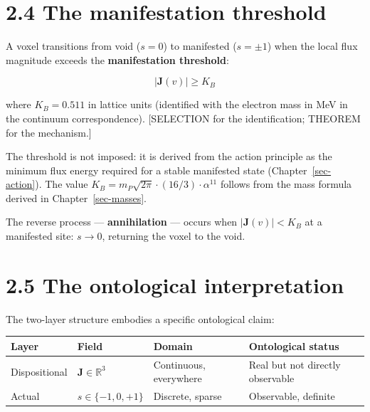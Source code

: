 \documentclass[
  11pt,
  letterpaper,
  twoside,
  openright]{book}
\begin{document}
\section{2.4 The manifestation threshold}\label{sec-threshold}

A voxel transitions from void (\(s = 0\)) to manifested (\(s = \pm 1\))
when the local flux magnitude exceeds the \textbf{manifestation
threshold}:

\[
|\mathbf{J}(v)| \geq K_B
\tag{2.2}
\]

where \(K_B = 0.511\) in lattice units (identified with the electron
mass in MeV in the continuum correspondence). {[}SELECTION for the
identification; THEOREM for the mechanism.{]}

The threshold is not imposed: it is derived from the action principle as
the minimum flux energy required for a stable manifested state
(Chapter~\ref{sec-action}). The value
\(K_B = m_P \sqrt{2\pi} \cdot (16/3) \cdot \alpha^{11}\) follows from
the mass formula derived in Chapter~\ref{sec-masses}.

The reverse process --- \textbf{annihilation} --- occurs when
\(|\mathbf{J}(v)| < K_B\) at a manifested site: \(s \to 0\), returning
the voxel to the void.

\section{2.5 The ontological
interpretation}\label{the-ontological-interpretation}

The two-layer structure embodies a specific ontological claim:

\begin{longtable}[]{@{}
  >{\raggedright\arraybackslash}p{}
  >{\raggedright\arraybackslash}p{}
  >{\raggedright\arraybackslash}p{}
  >{\raggedright\arraybackslash}p{}@{}}
\toprule\noalign{}
\begin{minipage}[b]{\linewidth}\raggedright
Layer
\end{minipage} & \begin{minipage}[b]{\linewidth}\raggedright
Field
\end{minipage} & \begin{minipage}[b]{\linewidth}\raggedright
Domain
\end{minipage} & \begin{minipage}[b]{\linewidth}\raggedright
Ontological status
\end{minipage} \\
\midrule\noalign{}
\endhead
\bottomrule\noalign{}
\endlastfoot
Dispositional & \(\mathbf{J} \in \mathbb{R}^3\) & Continuous, everywhere
& Real but not directly observable \\
Actual & \(s \in \{-1, 0, +1\}\) & Discrete, sparse & Observable,
definite \\
\end{longtable}
\end{document}
